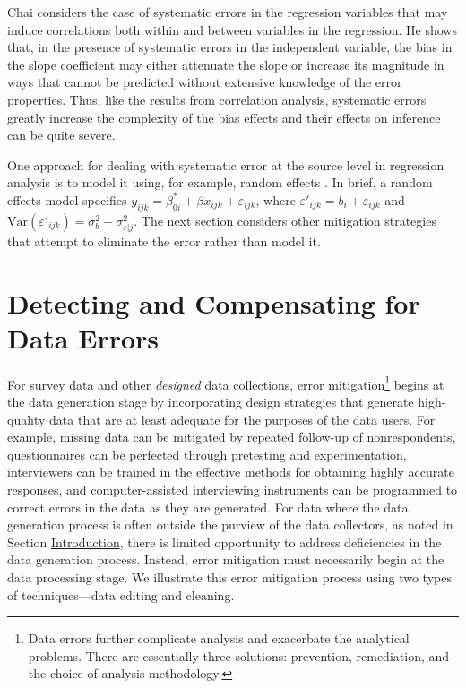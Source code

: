 \documentclass[]{krantz}
\begin{document}
Chai \citeyearpar{chai1971correlated} considers the case of systematic
errors in the regression variables that may induce correlations both
within and between variables in the regression. He shows that, in the
presence of systematic errors in the independent variable, the bias in
the slope coefficient may either attenuate the slope or increase its
magnitude in ways that cannot be predicted without extensive knowledge
of the error properties. Thus, like the results from correlation
analysis, systematic errors greatly increase the complexity of the bias
effects and their effects on inference can be quite severe.

One approach for dealing with systematic error at the source level in
regression analysis is to model it using, for example, random effects
\citep{hox2010multilevel}. In brief, a random effects model specifies
\(y_{ijk} = \beta_{0i}^\ast + \beta x_{ijk} + \varepsilon_{ijk}\), where
\({\varepsilon }'_{ijk} = b_i + \varepsilon_{ijk}\) and
\(\mathrm{Var}({\varepsilon }'_{ijk} ) = \sigma_b^2 + \sigma_{\varepsilon \vert j}^2\).
The next section considers other mitigation strategies that attempt to
eliminate the error rather than model it.

\section{Detecting and Compensating for Data Errors}\label{sec:10-5}

For survey data and other \emph{designed} data collections, error
mitigation\footnote{Data errors further complicate analysis and
  exacerbate the analytical problems. There are essentially three
  solutions: prevention, remediation, and the choice of analysis
  methodology.} begins at the data generation stage by incorporating
design strategies that generate high-quality data that are at least
adequate for the purposes of the data users. For example, missing data
can be mitigated by repeated follow-up of nonrespondents, questionnaires
can be perfected through pretesting and experimentation, interviewers
can be trained in the effective methods for obtaining highly accurate
responses, and computer-assisted interviewing instruments can be
programmed to correct errors in the data as they are generated. For data
where the data generation process is often outside the purview of the
data collectors, as noted in Section
\protect\hyperlink{sec:10-1}{Introduction}, there is limited opportunity
to address deficiencies in the data generation process. Instead, error
mitigation must necessarily begin at the data processing stage. We
illustrate this error mitigation process using two types of
techniques---data editing and cleaning.
\end{document}
